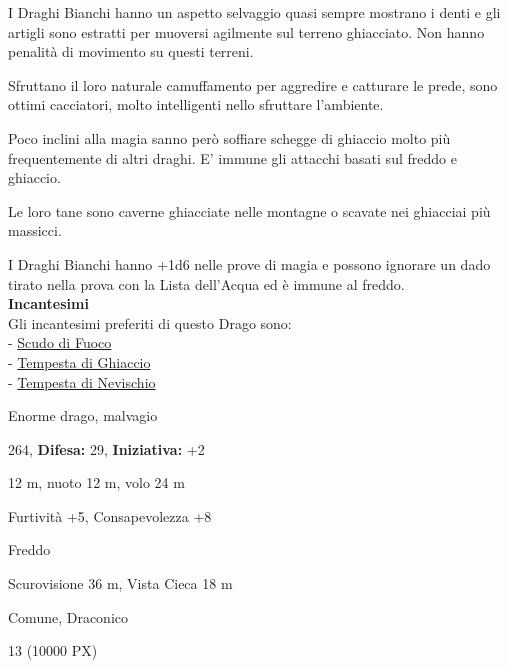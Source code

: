 \begin{multicols}{2}
{I Draghi Bianchi hanno un aspetto selvaggio quasi sempre mostrano i denti e gli artigli sono estratti per muoversi agilmente sul terreno ghiacciato.
Non hanno penalità di movimento su questi terreni.

Sfruttano il loro naturale camuffamento per aggredire e catturare le prede, sono ottimi cacciatori, molto intelligenti nello sfruttare l'ambiente.

Poco inclini alla magia sanno però soffiare schegge di ghiaccio molto più frequentemente di altri draghi. E' immune gli attacchi basati sul freddo e ghiaccio.

Le loro tane sono caverne ghiacciate nelle montagne o scavate nei ghiacciai più massicci.

I Draghi Bianchi hanno +1d6 nelle prove di magia e possono ignorare un dado tirato nella prova con la Lista dell'Acqua ed è immune al freddo.\\

\textbf{Incantesimi}\\
Gli incantesimi preferiti di questo Drago sono:\\
- \hyperlink{Scudo di Fuoco}{Scudo di Fuoco}\\
- \hyperlink{Tempesta di Ghiaccio}{Tempesta di Ghiaccio}\\
- \hyperlink{Tempesta di Nevischio}{Tempesta di Nevischio}

\noindent
\begin{description}[noitemsep, topsep=0pt, parsep=0pt, partopsep=0pt, leftmargin=0cm, labelwidth=2.2cm]
	\item[\textbf{Taglia/Tipo:}] Enorme drago, malvagio
	\item[\textbf{Caratt.:}] 
	\item[\textbf{Punti Ferita:}] 264,  \textbf{Difesa:} 29,  \textbf{Iniziativa:} +2
	\item[\textbf{Movimento:}] 12 m, nuoto 12 m, volo 24 m
	\item[\textbf{Tiri Salvez.:}] 
	\item[\textbf{Comp.:}] Furtività +5, Consapevolezza +8
	\item[\textbf{Imm. Danni:}] Freddo
	\item[\textbf{Sensi:}] Scurovisione 36 m, Vista Cieca 18 m
	\item[\textbf{Linguaggi:}] Comune, Draconico
	\item[\textbf{Sfida:}] 13 (10000 PX)\smallskip
\end{description}

}
\end{multicols}
